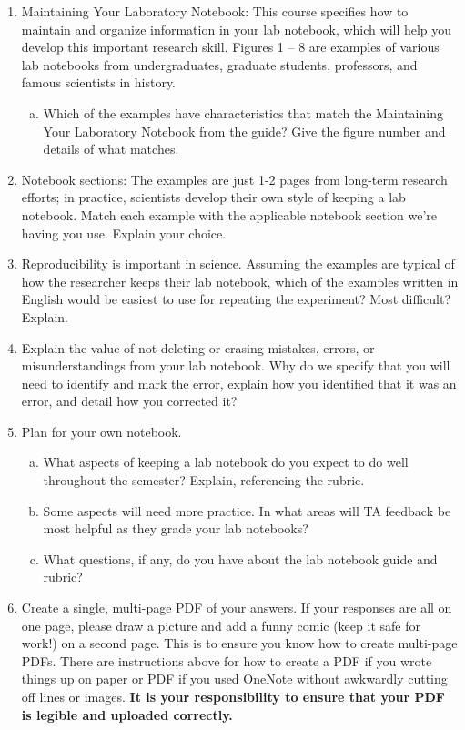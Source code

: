 \documentclass[idxtotoc,hyperref,openany]{labbook} %
\begin{document}
\begin{enumerate}
    \item Maintaining Your Laboratory Notebook: This course specifies how to maintain and organize information in your lab notebook, which will help you develop this important research skill. Figures 1 – 8 are examples of various lab notebooks from undergraduates, graduate students, professors, and famous scientists in history.
    \begin{enumerate}[(a)] %
        \item Which of the examples have characteristics that match the Maintaining Your Laboratory Notebook from the guide? Give the figure number and details of what matches.
    \end{enumerate}
    \item Notebook sections: The examples are just 1-2 pages from long-term research efforts; in practice, scientists develop their own style of keeping a lab notebook. Match each example with the applicable notebook section we’re having you use. Explain your choice.
    \item Reproducibility is important in science. Assuming the examples are typical of how the researcher keeps their lab notebook, which of the examples written in English would be easiest to use for repeating the experiment? Most difficult? Explain.
    \item Explain the value of not deleting or erasing mistakes, errors, or misunderstandings from your lab notebook. Why do we specify that you will need to identify and mark the error, explain how you identified that it was an error, and detail how you corrected it?
    \item Plan for your own notebook.
    \begin{enumerate}[(a)]
        \item What aspects of keeping a lab notebook do you expect to do well throughout the semester? Explain, referencing the rubric.
        \item Some aspects will need more practice. In what areas will TA feedback be most helpful as they grade your lab notebooks?
        \item What questions, if any, do you have about the lab notebook guide and rubric?
    \end{enumerate}
    \item Create a single, multi-page PDF of your answers. If your responses are all on one page, please draw a picture and add a funny comic (keep it safe for work!) on a second page. This is to ensure you know how to create multi-page PDFs. There are instructions above for how to create a PDF if you wrote things up on paper or PDF if you used OneNote without awkwardly cutting off lines or images. \textbf{It is your responsibility to ensure that your PDF is legible and uploaded correctly.}
\end{enumerate}
\end{document}
